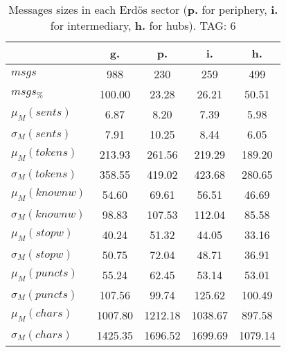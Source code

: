 \begin{table}[h!]
\begin{center}
\begin{tabular}{| l || c | c | c | c |}\hline
 & {\bf g.} & {\bf p.} & {\bf i.} & {\bf h.} \\\hline\hline
$msgs$ & 988  & 230  & 259  & 499 \\
$msgs_{\%}$ & 100.00  & 23.28  & 26.21  & 50.51 \\\hline
$\mu_M(sents)$ & 6.87  & 8.20  & 7.39  & 5.98 \\
$\sigma_M(sents)$ & 7.91  & 10.25  & 8.44  & 6.05 \\\hline
$\mu_M(tokens)$ & 213.93  & 261.56  & 219.29  & 189.20 \\
$\sigma_M(tokens)$ & 358.55  & 419.02  & 423.68  & 280.65 \\\hline
$\mu_M(knownw)$ & 54.60  & 69.61  & 56.51  & 46.69 \\
$\sigma_M(knownw)$ & 98.83  & 107.53  & 112.04  & 85.58 \\\hline
$\mu_M(stopw)$ & 40.24  & 51.32  & 44.05  & 33.16 \\
$\sigma_M(stopw)$ & 50.75  & 72.04  & 48.71  & 36.91 \\\hline
$\mu_M(puncts)$ & 55.24  & 62.45  & 53.14  & 53.01 \\
$\sigma_M(puncts)$ & 107.56  & 99.74  & 125.62  & 100.49 \\\hline
$\mu_M(chars)$ & 1007.80  & 1212.18  & 1038.67  & 897.58 \\
$\sigma_M(chars)$ & 1425.35  & 1696.52  & 1699.69  & 1079.14 \\\hline
\end{tabular}
\caption{Messages sizes in each Erd\"os sector ({{\bf p.}} for periphery, {{\bf i.}} for intermediary, {{\bf h.}} for hubs). TAG: 6}
\end{center}
\end{table}